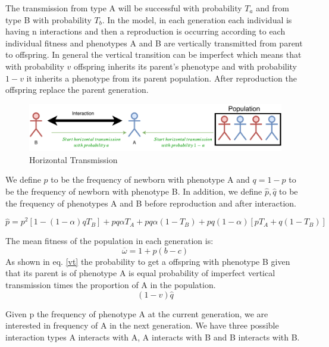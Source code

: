 \documentclass{article}
\begin{document}
The transmission from type A will be successful with probability $T_a$ and from type B with probability $T_b$.
In the model, in each generation each individual is having n interactions and then a reproduction is occurring according to each individual fitness and phenotypes A and B are vertically transmitted from parent to offspring. In general the vertical transition can be imperfect which means that with probability $v$ offspring inherits its parent’s phenotype and with probability $1-v$ it inherits a phenotype from its parent population. After reproduction the offspring replace the parent generation.
\begin{figure}[h!]
  \centering
  \includegraphics[scale=1]{figure.pdf}
  \caption{Horizontal Transmission}
  \label{fig:figure}
\end{figure}


We define $p$ to be the frequency of newborn with phenotype A and $q=1-p$ to be the frequency of newborn with phenotype B. In addition, we define $\hat{p},\hat{q}$ to be the frequency of phenotypes A and B before reproduction and after interaction.

\begin{equation} \label{d}
\hat{p} = p^2\left[1-\left(1-\alpha\right)qT_B\right] + pq\alpha T_A + pq\alpha(1-T_B) + pq(1-\alpha)[pT_A+q(1-T_B)]
\end{equation}

The mean fitness of the population in each generation is:
\begin{equation} \label{d}
\overline{\omega} = 1 + p(b-c)
\end{equation}
As shown in eq. \eqref{vt} the probability to get a offspring with phenotype B given that its parent is of phenotype A is equal probability of imperfect vertical transmission times the proportion of A in the population. 
\begin{equation} \label{vt}
(1-v)\hat{q}
\end{equation}

Given p the frequency of phenotype A at the current generation, we are interested in frequency of A in the next generation. We have three possible interaction types A interacts with A, A interacts with B and B interacts with B.
\end{document}
